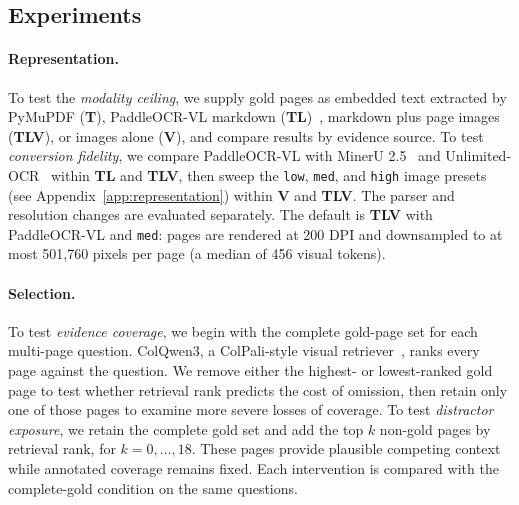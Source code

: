 \documentclass[11pt]{article}
\begin{document}
\subsection{Experiments}
\label{sec:experiment_design}

\paragraph{Representation.}
To test the \textit{modality ceiling}, we supply gold pages as embedded text extracted by PyMuPDF (\textbf{T}), PaddleOCR-VL markdown (\textbf{TL})~\citep{cui2025paddleocr}, markdown plus page images (\textbf{TLV}), or images alone (\textbf{V}), and compare results by evidence source. To test \textit{conversion fidelity}, we compare PaddleOCR-VL with MinerU 2.5~\citep{niu2026mineru2} and Unlimited-OCR~\citep{yin2026unlimited} within \textbf{TL} and \textbf{TLV}, then sweep the \texttt{low}, \texttt{med}, and \texttt{high} image presets (see Appendix~\ref{app:representation}) within \textbf{V} and \textbf{TLV}. The parser and resolution changes are evaluated separately. The default is \textbf{TLV} with PaddleOCR-VL and \texttt{med}: pages are rendered at 200 DPI and downsampled to at most 501,760 pixels per page (a median of 456 visual tokens).

\paragraph{Selection.}
To test \textit{evidence coverage}, we begin with the complete gold-page set for each multi-page question. ColQwen3, a ColPali-style visual retriever~\citep{faysse2025colpali}, ranks every page against the question. We remove either the highest- or lowest-ranked gold page to test whether retrieval rank predicts the cost of omission, then retain only one of those pages to examine more severe losses of coverage. To test \textit{distractor exposure}, we retain the complete gold set and add the top $k$ non-gold pages by retrieval rank, for $k=0,\ldots,18$. These pages provide plausible competing context while annotated coverage remains fixed. Each intervention is compared with the complete-gold condition on the same questions.
\end{document}
